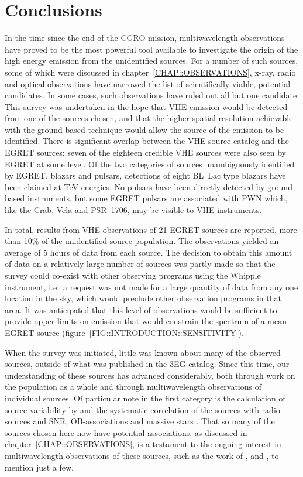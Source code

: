 \chapter{Conclusions}
\label{CHAP::CONCLUSIONS}

In the time since the end of the CGRO mission, multiwavelength
observations have proved to be the most powerful tool available to
investigate the origin of the high energy emission from the
unidentified sources. For a number of such sources, some of which were
discussed in chapter~\ref{CHAP::OBSERVATIONS}, x-ray, radio and
optical observations have narrowed the list of scientifically viable,
potential candidates. In some cases, such observations have ruled out
all but one candidate. This survey was undertaken in the hope that VHE
emission would be detected from one of the sources chosen, and that
the higher spatial resolution achievable with the ground-based
technique would allow the source of the \Gray emission to be
identified. There is significant overlap between the VHE source
catalog and the EGRET sources; seven of the eighteen credible VHE
sources were also seen by EGRET at some level. Of the two categories
of sources unambiguously identified by EGRET, blazars and pulsars,
detections of eight BL~Lac type blazars have been claimed at TeV
energies. No pulsars have been directly detected by ground-based
instruments, but some EGRET pulsars are associated with PWN which,
like the Crab, Vela and PSR~1706, may be visible to VHE \Gray
instruments.

In total, results from VHE observations of 21 EGRET sources are
reported, more than 10\% of the unidentified source population. The
observations yielded an average of 5 hours of data from each source.
The decision to obtain this amount of data on a relatively large
number of sources was partly made so that the survey could co-exist
with other observing programs using the Whipple instrument, i.e.\ a
request was not made for a large quantity of data from any one
location in the sky, which would preclude other observation programs
in that area. It was anticipated that this level of observations would
be sufficient to provide upper-limits on emission that would constrain
the spectrum of a mean EGRET source
(figure~\ref{FIG::INTRODUCTION::SENSITIVITY}).

When the survey was initiated, little was known about many of the
observed sources, outside of what was published in the 3EG
catalog. Since this time, our understanding of these sources has
advanced considerably, both through work on the population as a whole
and through multiwavelength observations of individual sources. Of
particular note in the first category is the calculation of source
variability by \citet{REF::NOLAN::APJ2003} and the systematic
correlation of the sources with radio sources
\citep{REF::MATTOX::APJS2001} and SNR, OB-associations and massive
stars \citep{REF::ROMERO::AA1999}. That so many of the sources chosen
here now have potential associations, as discussed in
chapter~\ref{CHAP::OBSERVATIONS}, is a testament to the ongoing
interest in multiwavelength observations of these sources, such as the
work of \citet{REF::ROBERTS::APJS2001},
\citet{REF::MUKHERJEE::APJ2000} and \citet{REF::KAARET::APJ1999}, to
mention just a few.

